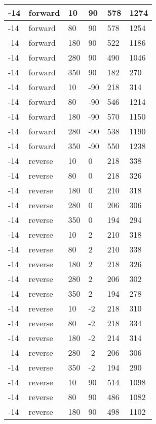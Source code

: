 \begin{table}
\begin{center}
\begin{tabular}{|l|l|l|l|l|l|}
			\hline
			-14 & forward & 10 & 90 & 578 & 1274 \\
			\hline
			-14 & forward & 80 & 90 & 578 & 1254 \\
			\hline
			-14 & forward & 180 & 90 & 522 & 1186 \\
			\hline
			-14 & forward & 280 & 90 & 490 & 1046 \\
			\hline
			-14 & forward & 350 & 90 & 182 & 270 \\
			\hline
			-14 & forward & 10 & -90 & 218 & 314 \\
			\hline
			-14 & forward & 80 & -90 & 546 & 1214 \\
			\hline
			-14 & forward & 180 & -90 & 570 & 1150 \\
			\hline
			-14 & forward & 280 & -90 & 538 & 1190 \\
			\hline
			-14 & forward & 350 & -90 & 550 & 1238 \\
			\hline
			-14 & reverse & 10 & 0 & 218 & 338 \\
			\hline
			-14 & reverse & 80 & 0 & 218 & 326 \\
			\hline
			-14 & reverse & 180 & 0 & 210 & 318 \\
			\hline
			-14 & reverse & 280 & 0 & 206 & 306 \\
			\hline
			-14 & reverse & 350 & 0 & 194 & 294 \\
			\hline
			-14 & reverse & 10 & 2 & 210 & 318 \\
			\hline
			-14 & reverse & 80 & 2 & 210 & 338 \\
			\hline
			-14 & reverse & 180 & 2 & 218 & 326 \\
			\hline
			-14 & reverse & 280 & 2 & 206 & 302 \\
			\hline
			-14 & reverse & 350 & 2 & 194 & 278 \\
			\hline
			-14 & reverse & 10 & -2 & 218 & 310 \\
			\hline
			-14 & reverse & 80 & -2 & 218 & 334 \\
			\hline
			-14 & reverse & 180 & -2 & 214 & 314 \\
			\hline
			-14 & reverse & 280 & -2 & 206 & 306 \\
			\hline
			-14 & reverse & 350 & -2 & 194 & 290 \\
			\hline
			-14 & reverse & 10 & 90 & 514 & 1098 \\
			\hline
			-14 & reverse & 80 & 90 & 486 & 1082 \\
			\hline
			-14 & reverse & 180 & 90 & 498 & 1102 \\
			\hline

\end{tabular}
\end{center}
\end{table}
